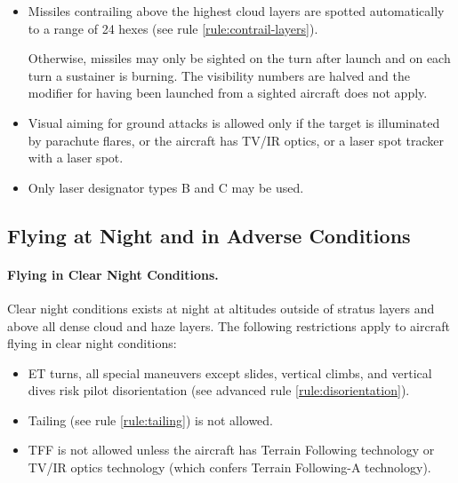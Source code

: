 \begin{advancedrules}
{\begin{itemize}
    \item{} Missiles contrailing above the highest cloud layers are spotted automatically to a range of 24 hexes (see rule \ref{rule:contrail-layers}). 
    
    Otherwise, missiles may only be sighted on the turn after launch and on each turn a sustainer is burning. The visibility numbers are halved and the modifier for having been launched from a sighted aircraft does not apply.

    \item{} Visual aiming for ground attacks is allowed only if the target is illuminated by parachute flares, or the aircraft has TV/IR optics, or a laser spot tracker with a laser spot.

    \item{} Only laser designator types B and C may be used.

\end{itemize}

\subsection{Flying at Night and in Adverse Conditions}

\paragraph{Flying in Clear Night Conditions.}

Clear night conditions exists at night at altitudes outside of stratus layers and above all dense cloud and haze layers. The following restrictions apply to aircraft flying in clear night conditions:

\begin{itemize}

    \item{} ET turns, all special maneuvers except slides, vertical climbs, and vertical dives risk pilot disorientation (see advanced rule \ref{rule:disorientation}).

    \item{} Tailing (see rule \ref{rule:tailing}) is not allowed.
    
    \item{} TFF is not allowed unless the aircraft has Terrain Following technology or TV/IR optics technology (which confers Terrain Following-A technology).


\end{itemize}}
\end{advancedrules}
